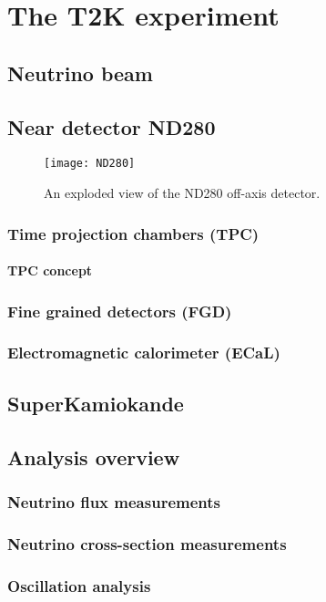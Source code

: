 \documentclass[../main.tex]{subfiles}
\begin{document}
\renewcommand{\labelitemi}{\ding{226}}
\renewcommand{\labelitemii}{\ding{227}}

\part{The T2K experiment}
\label{T2K:general}

\chapter{Neutrino beam}
\chapter{Near detector ND280}
\begin{figure}[h!]
    \begin{center}
    \texttt{[image: ND280]}
    \caption{An exploded view of the ND280 off-axis detector.}
    \label{T2K:fig:ND280}
    \end{center}
\end{figure}
\section{Time projection chambers (TPC)}
\subsection{TPC concept}
\section{Fine grained detectors (FGD)}
\section{Electromagnetic calorimeter (ECaL)}
\chapter{SuperKamiokande}
\chapter{Analysis overview}
\section{Neutrino flux measurements}
\section{Neutrino cross-section measurements}
\section{Oscillation analysis}
\end{document}
